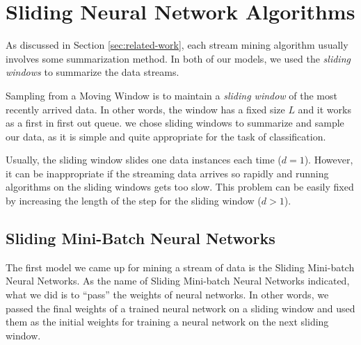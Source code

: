 \documentclass[conference]{IEEEtran}
\begin{document}
		\section{Sliding Neural Network Algorithms} 
		\label{sec:models}
		As discussed in Section \ref{sec:related-work}, each stream mining algorithm usually involves some summarization method. In both of our models,  we used the \emph{sliding windows} to summarize the data streams.
		
		Sampling from a Moving Window is to maintain a \emph{sliding window} of the most recently arrived data. In other words, the window has a fixed size $L$ and it works as a first in first out queue. we chose sliding windows to summarize and sample our data, as it is simple and quite appropriate for the task of classification. 
		
		Usually, the sliding window slides one data instances each time ($d=1$). However, it can be inappropriate if the streaming data arrives so rapidly and running algorithms on the sliding windows gets too slow. This problem can be easily fixed by increasing the length of the step for the sliding window ($d>1$).  
		
		\subsection{Sliding Mini-Batch Neural Networks}
		The first model we came up for mining a stream of data is the Sliding Mini-batch Neural Networks. As the name of Sliding Mini-batch Neural Networks indicated, what we did is to ``pass'' the weights of neural networks. In other words, we passed the final weights of a trained neural network on a sliding window and used them as the initial weights for training a neural network on the next sliding window.
		
\end{document}
